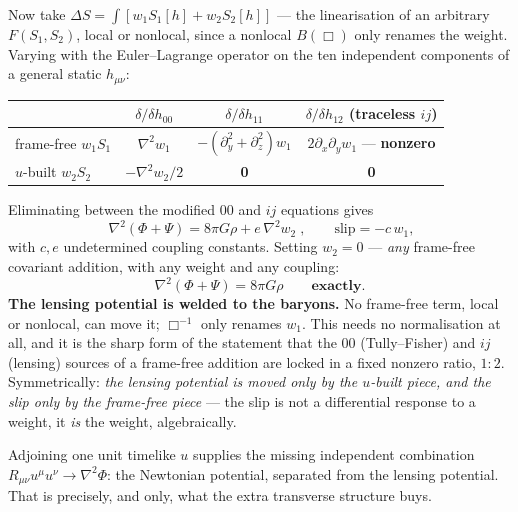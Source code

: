 \documentclass[11pt,letterpaper]{article}
\newcommand{\dal}{\Box}
\begin{document}
Now take $\Delta S=\int[w_1S_1[h]+w_2S_2[h]]$ --- the linearisation of an arbitrary $F(S_1,S_2)$, local or nonlocal, since a nonlocal $B(\dal)$ only renames the weight. Varying with the Euler--Lagrange operator on the ten independent components of a general static $h_{\mu\nu}$:
\begin{center}\small
\begin{tabular}{lccc}\toprule
& $\delta/\delta h_{00}$ & $\delta/\delta h_{11}$ & $\delta/\delta h_{12}$ (traceless $ij$)\\\midrule
frame-free $w_1S_1$ & $\nabla^2w_1$ & $-(\partial_y^2+\partial_z^2)w_1$ & $2\partial_x\partial_yw_1$ --- \textbf{nonzero}\\
$u$-built $w_2S_2$ & $-\nabla^2w_2/2$ & \textbf{0} & \textbf{0}\\\bottomrule
\end{tabular}
\end{center}
Eliminating between the modified $00$ and $ij$ equations gives
\begin{equation}
\boxed{\;\nabla^2(\Phi+\Psi)=8\pi G\rho+e\,\nabla^2w_2\;},\qquad \text{slip}=-c\,w_1 ,
\end{equation}
with $c,e$ undetermined coupling constants. Setting $w_2=0$ --- \emph{any} frame-free covariant addition, with any weight and any coupling:
\begin{equation}
\nabla^2(\Phi+\Psi)=8\pi G\rho\qquad\textbf{exactly.}
\end{equation}
\textbf{The lensing potential is welded to the baryons.} No frame-free term, local or nonlocal, can move it; $\dal^{-1}$ only renames $w_1$. This needs no normalisation at all, and it is the sharp form of the statement that the $00$ (Tully--Fisher) and $ij$ (lensing) sources of a frame-free addition are locked in a fixed nonzero ratio, $1:2$. Symmetrically: \emph{the lensing potential is moved only by the $u$-built piece, and the slip only by the frame-free piece} --- the slip is not a differential response to a weight, it \emph{is} the weight, algebraically.

Adjoining one unit timelike $u$ supplies the missing independent combination $R_{\mu\nu}u^\mu u^\nu\to\nabla^2\Phi$: the Newtonian potential, separated from the lensing potential. That is precisely, and only, what the extra transverse structure buys.
\end{document}
